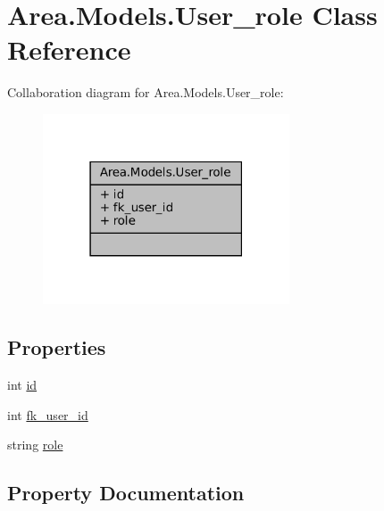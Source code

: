 \hypertarget{classArea_1_1Models_1_1User__role}{}\section{Area.\+Models.\+User\+\_\+role Class Reference}
\label{classArea_1_1Models_1_1User__role}


Collaboration diagram for Area.\+Models.\+User\+\_\+role\+:
\nopagebreak
\begin{figure}[H]
\begin{center}
\leavevmode
\includegraphics[width=207pt]{classArea_1_1Models_1_1User__role__coll__graph}
\end{center}
\end{figure}
\subsection*{Properties}
\begin{DoxyCompactItemize}
\item 
int \mbox{\hyperlink{classArea_1_1Models_1_1User__role_ae159154da6bff6dd4eff822287b6f855}{id}}
\item 
int \mbox{\hyperlink{classArea_1_1Models_1_1User__role_a108c9b7e70f3c46ad72343e71a8e8331}{fk\+\_\+user\+\_\+id}}
\item 
string \mbox{\hyperlink{classArea_1_1Models_1_1User__role_a97c6a2c0cac591e1252e194b0d25c309}{role}}
\end{DoxyCompactItemize}


\subsection{Property Documentation}
\mbox{\label{classArea_1_1Models_1_1User__role_a108c9b7e70f3c46ad72343e71a8e8331}} 
